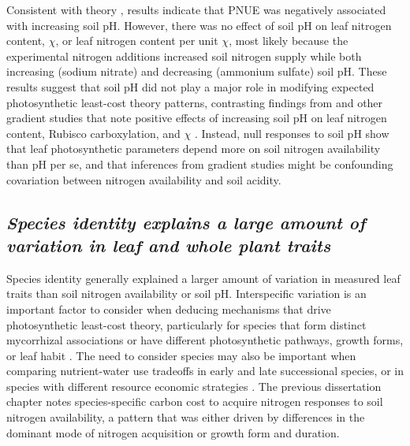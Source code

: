 Consistent with theory , results indicate that PNUE was negatively associated with increasing soil pH. However, there was no effect of soil pH on leaf nitrogen content, $\chi$, or leaf nitrogen content per unit $\chi$, most likely because the experimental nitrogen additions increased soil nitrogen supply while both increasing (sodium nitrate) and decreasing (ammonium sulfate) soil pH. These results suggest that soil pH did not play a major role in modifying expected photosynthetic least-cost theory patterns, contrasting findings from  and other gradient studies that note positive effects of increasing soil pH on leaf nitrogen content, Rubisco carboxylation, and $\chi$ . Instead, null responses to soil pH show that leaf photosynthetic parameters depend more on soil nitrogen availability than pH per se, and that inferences from gradient studies might be confounding covariation between nitrogen availability and soil acidity.

\subsection{\textit{Species identity explains a large amount of variation in leaf and whole plant traits}}
\noindent Species identity generally explained a larger amount of variation in measured leaf traits than soil nitrogen availability or soil pH. Interspecific variation is an important factor to consider when deducing mechanisms that drive photosynthetic least-cost theory, particularly for species that form distinct mycorrhizal associations or have different photosynthetic pathways, growth forms, or leaf habit . The need to consider species may also be important when comparing nutrient-water use tradeoffs in early and late successional species, or in species with different resource economic strategies . The previous dissertation chapter notes species-specific carbon cost to acquire nitrogen responses to soil nitrogen availability, a pattern that was either driven by differences in the dominant mode of nitrogen acquisition or growth form and duration.
    
